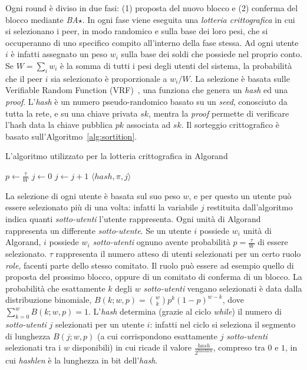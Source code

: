 Ogni round è diviso in due fasi: (1) proposta del nuovo blocco e (2) conferma del blocco mediante \emph{BA$\star$}.
In ogni fase viene eseguita una \emph{lotteria crittografica} in cui si selezionano i peer, in modo randomico e sulla base dei loro pesi, che si occuperanno di uno specifico compito all'interno della fase stessa. Ad ogni utente $i$ è infatti assegnato un peso $w_i$ sulla base dei soldi che possiede nel proprio conto. Se $W = \sum_i w_i$ è la somma di tutti i pesi degli utenti del sistema, la probabilità che il peer $i$ sia selezionato è proporzionale a $w_i/W$. La selezione è basata sulle Verifiable Random Function (VRF)~\cite{micali1999verifiable}, una funziona che genera un \emph{hash} ed una \emph{proof}. L'\emph{hash} è un numero pseudo-randomico basato su un \emph{seed}, conosciuto da tutta la rete, e su una chiave privata $sk$, mentra la \emph{proof} permette di verificare l'hash data la chiave pubblica $pk$ associata ad $sk$.
Il sorteggio crittografico è basato sull'Algoritmo~\ref{alg:sortition}.
\begin{algorithm}
	\caption{L'algoritmo utilizzato per la lotteria crittografica in Algorand}
	\begin{algorithmic}
			\State $p \leftarrow \frac{\tau}{W}$
			\State $j \leftarrow 0$
			\While{$\frac{hash}{2^{hashlen}} \notin [ \sum_{k = 0}^j B(k; w, p), \sum_{k=0}^{j+1} B(k; w, p) )$}
			\State $j \leftarrow j + 1$
			\EndWhile
			\Return $\langle hash, \pi, j \rangle$
		\EndProcedure
	\end{algorithmic}
	\label{alg:sortition}
\end{algorithm}
La selezione di ogni utente è basata sul suo peso $w$, e per questo un utente può essere selezionato più di una volta: infatti la variabile $j$ restituita dall'algoritmo indica quanti \emph{sotto-utenti} l'utente rappresenta. Ogni unità di Algorand rappresenta un differente \emph{sotto-utente}. Se un utente $i$ possiede $w_i$ unità di Algorand, $i$ possiede $w_i$ \emph{sotto-utenti} ognuno avente probabilità $p = \frac{\tau}{W}$ di essere selezionato. $\tau$ rappresenta il numero atteso di utenti selezionati per un certo ruolo \emph{role}, facenti parte dello stesso comitato. Il ruolo può essere ad esempio quello di proposta del prossimo blocco, oppure di un comitato di conferma di un blocco. La probabilità che esattamente $k$ degli $w$ \emph{sotto-utenti} vengano selezionati è data dalla distribuzione binomiale, $B(k; w, p) = \binom{w}{k} p^k (1-p)^{w-k}$, dove $\sum_{k=0}^w B(k; w, p) = 1$. L'\emph{hash} determina (grazie al ciclo \emph{while}) il numero di \emph{sotto-utenti} $j$ selezionati per un utente $i$: infatti nel ciclo si seleziona il segmento di lunghezza $B(j; w, p)$ (a cui corrispondono esattamente $j$ \emph{sotto-utenti} selezionati tra i $w$ disponibili) in cui ricade il valore $\frac{hash}{2^{hashlen}}$, compreso tra $0$ e $1$, in cui \emph{hashlen} è la lunghezza in bit dell'\emph{hash}.

